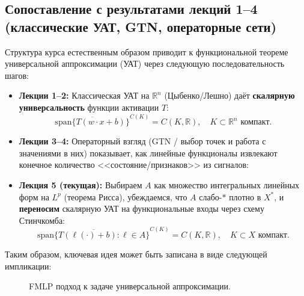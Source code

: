 \documentclass[../NDCNNAI_main.tex]{subfiles}
\begin{document}
\subsection{Сопоставление с результатами лекций 1--4 (классические УАТ, GTN, операторные сети)}
\label{sec:big-picture}

Структура курса естественным образом приводит к функциональной теореме универсальной аппроксимации (УАТ) через следующую последовательность шагов:

\begin{itemize}
    \item \textbf{Лекции 1--2:} Классическая УАТ на \(\mathbb{R}^n\) (Цыбенко/Лешно) даёт \textbf{скалярную универсальность} функции активации \(T\):
    \[
    \overline{\mathrm{span}\{T(w \cdot x + b)\}}^{C(K)} = C(K, \mathbb{R}), \quad K \subset \mathbb{R}^n \text{ компакт}.
    \]

    \item \textbf{Лекции 3--4:} Операторный взгляд (GTN / выбор точек и работа с значениями в них) показывает, как линейные функционалы извлекают конечное количество <<состояние/признаков>> из сигналов:

    \item \textbf{Лекция 5 (текущая):} Выбираем \(A\) как множество интегральных линейных форм на \(L^p\) (теорема Рисса), убеждаемся, что \(A\) слабо-$\ast$ плотно в \(X^*\), и \textbf{переносим} скалярную УАТ на функциональные входы через схему Стинчкомба:
    \[
    \overline{\mathrm{span}\{T(\ell(\cdot) + b) : \ell \in A\}}^{C(K)} = C(K, \mathbb{R}), \quad K \subset X \text{ компакт}.
    \]
\end{itemize}

Таким образом, ключевая идея может быть записана в виде следующей импликации:

\begin{figure}
\begin{center}
\end{center}
\caption{FMLP подход к задаче универсальной аппроксимации.}
\end{figure}
\end{document}
